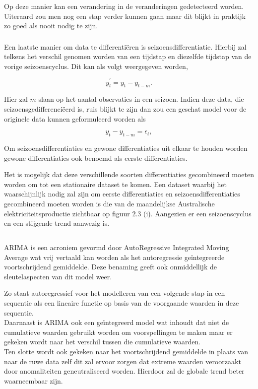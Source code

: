 Op deze manier kan een verandering in de veranderingen gedetecteerd worden. Uiteraard zou men nog een stap verder kunnen gaan maar dit blijkt in praktijk zo goed als nooit nodig te zijn.

\subsubsection{}
Een laatste manier om data te differenti\"{e}ren is seizoensdifferentiatie. Hierbij zal telkens het verschil genomen worden van een tijdstap en diezelfde tijdstap van de vorige seizoenscyclus. Dit kan als volgt weergegeven worden,

\begin{equation}
y_t^\prime = y_t - y_{t-m}.
\end{equation}

Hier zal $m$ slaan op het aantal observaties in een seizoen. Indien deze data, die seizoensgedifferenci\"{e}erd is, ruis blijkt te zijn dan zou een geschat model voor de originele data kunnen geformuleerd worden als

 \begin{equation}
y_t - y_{t-m} = \epsilon_t,
 \end{equation}

Om seizoensdifferentiaties en gewone differentiaties uit elkaar te houden worden gewone differentiaties ook benoemd als eerste differentiaties. 

Het is mogelijk dat deze verschillende soorten differentiaties gecombineerd moeten worden om tot een stationaire dataset te komen. Een dataset waarbij het waarschijnlijk nodig zal zijn om eerste differentiaties en seizoensdifferentiaties gecombineerd moeten worden is die van de maandelijkse Australische elektriciteitsproductie zichtbaar op figuur 2.3 (i). Aangezien er een seizoenscyclus en een stijgende trend aanwezig is.

\subsection{}

ARIMA is een acroniem gevormd door AutoRegressive Integrated Moving Average wat vrij vertaald kan worden als het autoregressie ge\"{i}ntegreerde voortschrijdend gemiddelde. Deze benaming geeft ook onmiddellijk de sleutelaspecten van dit model weer. 

Zo staat autoregressief voor het modelleren van een volgende stap in een sequentie als een lineaire functie op basis van de voorgaande waarden in deze sequentie.
\\Daarnaast is ARIMA ook een ge\"{i}ntegreerd model wat inhoudt dat niet de cumulatieve waarden gebruikt worden om voorspellingen te maken maar er gekeken wordt naar het verschil tussen die cumulatieve waarden.
\\Ten slotte wordt ook gekeken naar het voortschrijdend gemiddelde in plaats van naar de ruwe data zelf dit zal ervoor zorgen dat extreme waarden veroorzaakt door anomaliteiten geneutraliseerd worden. Hierdoor zal de globale trend beter waarneembaar zijn.

